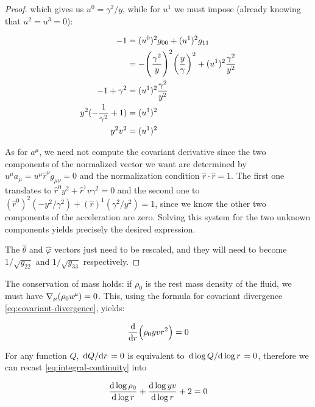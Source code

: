 \documentclass[main.tex]{subfiles}
\begin{document}
\begin{proof}
    which gives us \(u^0 = \gamma^2 / y\), while for \(u^1\) we must impose (already knowing that \(u^2 = u^3 = 0\)):

    \begin{subequations}
    \begin{align}
      -1 &= (u^0)^2 g_{00} + (u^1)^2 g_{11} \\
      &= -\qty(\frac{\gamma^2}{y})^2 \qty(\frac{y}{\gamma} )^2 + (u^1)^2 \frac{\gamma^2}{y^2} \\
      -1 + \gamma^2 &= (u^1)^2 \frac{\gamma^2}{y^2} \\
      y^2 (-\frac{1}{\gamma^2}  + 1) &= (u^1)^2 \\
      y^2 v^2 &= (u^1)^2
    \end{align}
    \end{subequations}

    As for \(a^\mu\), we need not compute the covariant derivative since the two components of the normalized vector we want are determined by \(u^\mu a_\mu = u^\mu \hat{r}^\nu g_{\mu\nu} = 0\) and the normalization condition \(\hat{r} \cdot \hat{r} = 1\). The first one translates to \(\hat{r}^0 y^2 + \hat{r} ^1 v \gamma^2 = 0\) and the second one to \((\hat{r}^0)^2 (- y^2 / \gamma^2) + (\hat{r})^1 (\gamma^2 / y^2) = 1\), since we know the other two components of the acceleration are zero.
    Solving this system for the two unknown components yields precisely the desired expression.

    The \(\hat{\theta}\) and \(\hat{\varphi}\) vectors just need to be rescaled, and they will need to become \(1 / \sqrt{g_{22}}\) and \(1/\sqrt{g_{33}}\) respectively.
\end{proof}

The conservation of mass holds: if $\rho_0$ is the rest mass density of the fluid, we must have $\nabla_\mu \qty(\rho_0 u^\mu) =0$. This, using the formula for covariant divergence \eqref{eq:covariant-divergence}, yields:

\begin{equation} \label{eq:integral-continuity}
    \dv{}{r} \qty(\rho_0 yvr^2) = 0
\end{equation}

For any function \(Q\),  \(\dv*{Q}{r} = 0\) is equivalent to \(\dv*{\log Q }{\log r} = 0 \), therefore we can recast \eqref{eq:integral-continuity} into

\begin{equation} \label{eq:differential-continuity}
  \dv{\log \rho_0}{\log r} +
  \dv{\log yv}{\log r} + 2 = 0
\end{equation}
\end{document}
